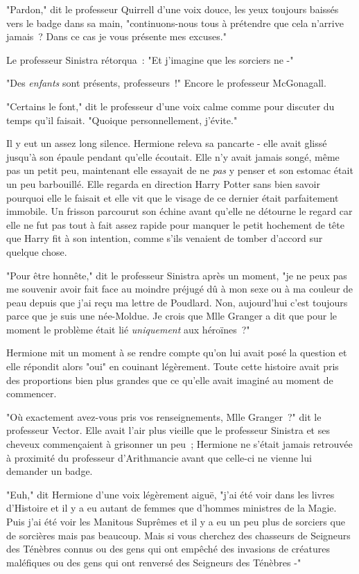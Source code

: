 "Pardon," dit le professeur Quirrell d'une voix douce, les yeux toujours baissés vers le badge dans sa main, "continuons-nous tous à prétendre que cela n'arrive jamais~? Dans ce cas je vous présente mes excuses."

Le professeur Sinistra rétorqua~: "Et j'imagine que les sorciers ne -"

"Des \emph{enfants} sont présents, professeurs~!" Encore le professeur McGonagall.

"Certains le font," dit le professeur d'une voix calme comme pour discuter du temps qu'il faisait. "Quoique personnellement, j'évite."

Il y eut un assez long silence. Hermione releva sa pancarte - elle avait glissé jusqu'à son épaule pendant qu'elle écoutait. Elle n'y avait jamais songé, même pas un petit peu, maintenant elle essayait de ne \emph{pas} y penser et son estomac était un peu barbouillé. Elle regarda en direction Harry Potter sans bien savoir pourquoi elle le faisait et elle vit que le visage de ce dernier était parfaitement immobile. Un frisson parcourut son échine avant qu'elle ne détourne le regard car elle ne fut pas tout à fait assez rapide pour manquer le petit hochement de tête que Harry fit à son intention, comme s'ils venaient de tomber d'accord sur quelque chose.

"Pour être honnête," dit le professeur Sinistra après un moment, "je ne peux pas me souvenir avoir fait face au moindre préjugé dû à mon sexe ou à ma couleur de peau depuis que j'ai reçu ma lettre de Poudlard. Non, aujourd'hui c'est toujours parce que je suis une née-Moldue. Je crois que Mlle Granger a dit que pour le moment le problème était lié \emph{uniquement} aux héroïnes~?"

Hermione mit un moment à se rendre compte qu'on lui avait posé la question et elle répondit alors "oui" en couinant légèrement. Toute cette histoire avait pris des proportions bien plus grandes que ce qu'elle avait imaginé au moment de commencer.

"Où exactement avez-vous pris vos renseignements, Mlle Granger~?" dit le professeur Vector. Elle avait l'air plus vieille que le professeur Sinistra et ses cheveux commençaient à grisonner un peu~; Hermione ne s'était jamais retrouvée à proximité du professeur d'Arithmancie avant que celle-ci ne vienne lui demander un badge.

"Euh," dit Hermione d'une voix légèrement aiguë, "j'ai été voir dans les livres d'Histoire et il y a eu autant de femmes que d'hommes ministres de la Magie. Puis j'ai été voir les Manitous Suprêmes et il y a eu un peu plus de sorciers que de sorcières mais pas beaucoup. Mais si vous cherchez des chasseurs de Seigneurs des Ténèbres connus ou des gens qui ont empêché des invasions de créatures maléfiques ou des gens qui ont renversé des Seigneurs des Ténèbres -"


